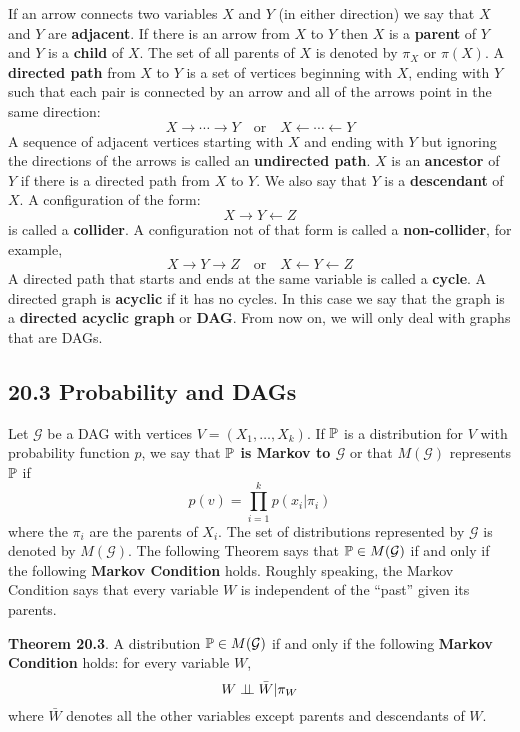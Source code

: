 If an arrow connects two variables \(X\) and \(Y\) (in either direction) we say that \(X\) and \(Y\) are \textbf{adjacent}. If there is an arrow from \(X\) to \(Y\) then \(X\) is a \textbf{parent} of \(Y\) and \(Y\) is a \textbf{child} of \(X\). The set of all parents of \(X\) is denoted by \(\pi_X\) or \(\pi(X)\). A \textbf{directed path} from \(X\) to \(Y\) is a set of vertices beginning with \(X\), ending with \(Y\) such that each pair is connected by an arrow and all of the arrows point in the same direction:
\[
X \rightarrow \cdots \rightarrow Y
\quad \text{or} \quad
X \leftarrow \cdots \leftarrow Y
\]
A sequence of adjacent vertices starting with \(X\) and ending with \(Y\) but ignoring the directions of the arrows is called an \textbf{undirected path}. \(X\) is an \textbf{ancestor} of \(Y\) if there is a directed path from \(X\) to \(Y\). We also say that \(Y\) is a \textbf{descendant} of \(X\).
A configuration of the form:
\[
X \rightarrow Y \leftarrow Z
\]
is called a \textbf{collider}. A configuration not of that form is called a \textbf{non-collider}, for example,
\[
X \rightarrow Y \rightarrow Z
\quad \text{or} \quad
X \leftarrow Y \leftarrow Z
\]
A directed path that starts and ends at the same variable is called a \textbf{cycle}. A directed graph is \textbf{acyclic} if it has no cycles. In this case we say that the graph is a \textbf{directed acyclic graph} or \textbf{DAG}. From now on, we will only deal with graphs that are DAGs.

\subsection*{20.3 Probability and DAGs}\label{probability:dags}
Let \(\mathcal{G}\) be a DAG with vertices \(V = (X_{1}, \dots, X_{k})\).
If \(\operatorname{\mathbb{P}}\) is a distribution for \(V\) with probability function \(p\), we say that \textbf{\(\operatorname{\mathbb{P}}\) is Markov to \(\mathcal{G}\)} or that \(M(\mathcal{G})\) represents \(\operatorname{\mathbb{P}}\) if
\[
p(v) = \prod_{i=1}^{k} p(x_{i} | \pi_{i})
\]
where the \(\pi_{i}\) are the parents of \(X_{i}\). The set of distributions represented by \(\mathcal{G}\) is denoted by \(M(\mathcal{G})\).
The following Theorem says that \(\operatorname{\mathbb{P}} \in M(\mathcal{G})\) if and only if the following \textbf{Markov Condition} holds. Roughly speaking, the Markov Condition says that every variable \(W\) is independent of the ``past'' given its parents.

\textbf{Theorem 20.3}. A distribution \(\operatorname{\mathbb{P}} \in M(\mathcal{G})\) if and only if the following \textbf{Markov Condition} holds: for every variable \(W\),
\[
W \perp\!\!\!\perp \bar{W} | \pi_W
\]
where \(\bar{W}\) denotes all the other variables except parents
and descendants of \(W\).

